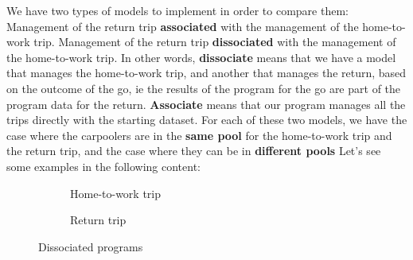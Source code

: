 \documentclass[12pt, a4paper, twoside]{memoir}
\newcommand{\newpar}{\vskip 0.2in \noindent}
\begin{document}
{	We have two types of models to implement in order to compare them: \newline
	Management of the return trip \textbf{associated} with the management of the home-to-work trip. \newline
	Management of the return trip \textbf{dissociated} with the management of the home-to-work trip.
	\newpar
	In other words, \textbf{dissociate} means that we have a model that manages the home-to-work trip, and another that manages the return, based on the outcome of the go, ie the results of the program for the go are part of the program data for the return. \textbf{Associate} means that our program manages all the trips directly with the starting dataset.
	\newpar
	For each of these two models, we have the case where the carpoolers are in the \textbf{same pool} for the home-to-work trip and the return trip, and the case where they can be in \textbf{different pools}
	\newpar
	Let's see some examples in the following content:
	\begin{figure}[H]
		\centering
		\begin{subfigure}{.5\textwidth}
			\centering
			\caption{Home-to-work trip}
		\end{subfigure}%
		\begin{subfigure}{.5\textwidth}
			\centering
			\caption{Return trip}
		\end{subfigure}
		\caption{Dissociated programs}
		\label{fig:dissociated programs}
	\end{figure}
	
}
\end{document}
